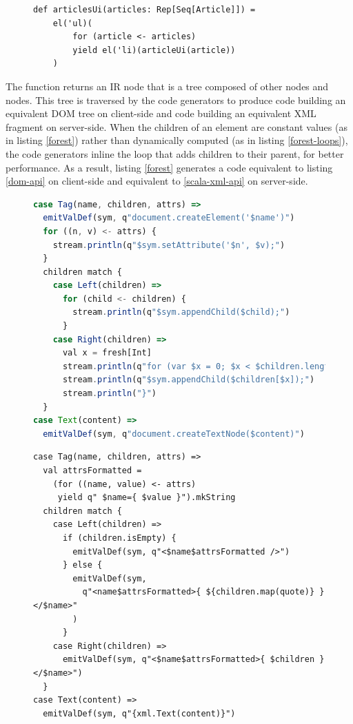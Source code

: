 \documentclass[preprint]{sigplanconf}
\begin{document}
\begin{figure}
\begin{lstlisting}[label=forest-loops,caption=Using loops]
def articlesUi(articles: Rep[Seq[Article]]) =
    el('ul)(
        for (article <- articles)
        yield el('li)(articleUi(article))
    )
\end{lstlisting}
\end{figure}

The  function returns an  IR node that is a tree composed of other  nodes and
 nodes. This tree is traversed by the code generators to produce code building an equivalent DOM tree on
client-side and code building an equivalent XML fragment on server-side. When the children of an element are constant
values (as in listing \ref{forest}) rather than dynamically computed (as in listing \ref{forest-loops}), the code
generators inline the loop that adds children to their parent, for better performance. As a result, listing
\ref{forest} generates a code equivalent to listing \ref{dom-api} on client-side and equivalent to
\ref{scala-xml-api} on server-side.

\begin{figure}
\begin{lstlisting}[language=JavaScript,label=js-gen-forest,caption=JavaScript code generator for the DOM fragment
definition DSL]
case Tag(name, children, attrs) =>
  emitValDef(sym, q"document.createElement('$name')")
  for ((n, v) <- attrs) {
    stream.println(q"$sym.setAttribute('$n', $v);")
  }
  children match {
    case Left(children) =>
      for (child <- children) {
        stream.println(q"$sym.appendChild($child);")
      }
    case Right(children) =>
      val x = fresh[Int]
      stream.println(q"for (var $x = 0; $x < $children.length; $x++) {")
      stream.println(q"$sym.appendChild($children[$x]);")
      stream.println("}")
  }
case Text(content) =>
  emitValDef(sym, q"document.createTextNode($content)")
\end{lstlisting}
\end{figure}

\begin{figure}
\begin{lstlisting}[label=scala-gen-forest,caption=Scala code generator for the DOM fragment definition DSL]
case Tag(name, children, attrs) =>
  val attrsFormatted =
    (for ((name, value) <- attrs)
     yield q" $name={ $value }").mkString
  children match {
    case Left(children) =>
      if (children.isEmpty) {
        emitValDef(sym, q"<$name$attrsFormatted />")
      } else {
        emitValDef(sym,
          q"<name$attrsFormatted>{ ${children.map(quote)} }</$name>"
        )
      }
    case Right(children) =>
      emitValDef(sym, q"<$name$attrsFormatted>{ $children }</$name>")
  }
case Text(content) =>
  emitValDef(sym, q"{xml.Text(content)}")
\end{lstlisting}
\end{figure}
\end{document}
